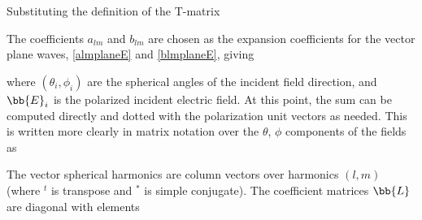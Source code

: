 Substituting the definition of the T-matrix

The coefficients $a_{lm}$ and $b_{lm}$ are chosen as the expansion coefficients for the vector plane waves, \eqref{almplaneE} and \eqref{blmplaneE}, giving 

\noindent where $(\theta_i,\phi_i)$ are the spherical angles of the incident field direction, and $\bb{E}_i$ is the polarized incident electric field.  At this point, the sum can be computed directly and dotted with the polarization unit vectors as needed.  This is written more clearly in matrix notation over the $\theta$, $\phi$ components of the fields as

The vector spherical harmonics are column vectors over harmonics $(l,m)$ (where $^t$ is transpose and $^*$ is simple conjugate). The coefficient matrices $\bb{L}$ are diagonal with elements


